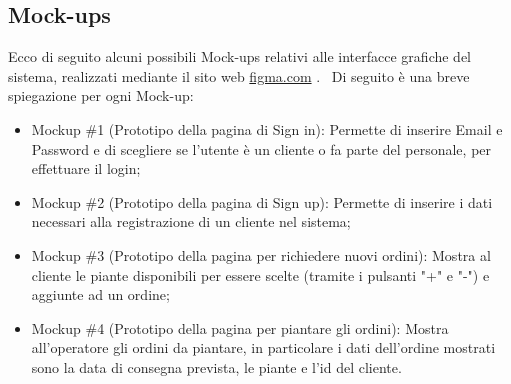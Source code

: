 \documentclass{article}
\begin{document}
\subsection{Mock-ups}
Ecco di seguito alcuni possibili Mock-ups relativi alle interfacce grafiche del sistema, realizzati mediante il sito web \href{https://www.figma.com}{figma.com} . \
Di seguito è una breve spiegazione per ogni Mock-up:
\begin{itemize}
    \item Mockup \#1 (Prototipo della pagina di Sign in): Permette di inserire Email e Password e di scegliere se l'utente è un cliente o fa parte del personale, per effettuare il login;
    \item Mockup \#2 (Prototipo della pagina di Sign up): Permette di inserire i dati necessari alla registrazione di un cliente nel sistema;
    \item Mockup \#3 (Prototipo della pagina per richiedere nuovi ordini): Mostra al cliente le piante disponibili per essere scelte (tramite i pulsanti "+" e "-") e aggiunte ad un ordine;
    \item Mockup \#4 (Prototipo della pagina per piantare gli ordini): Mostra all'operatore gli ordini da piantare, in particolare i dati dell'ordine mostrati sono la data di consegna prevista, le piante e l'id del cliente.
\end{itemize}
\end{document}
